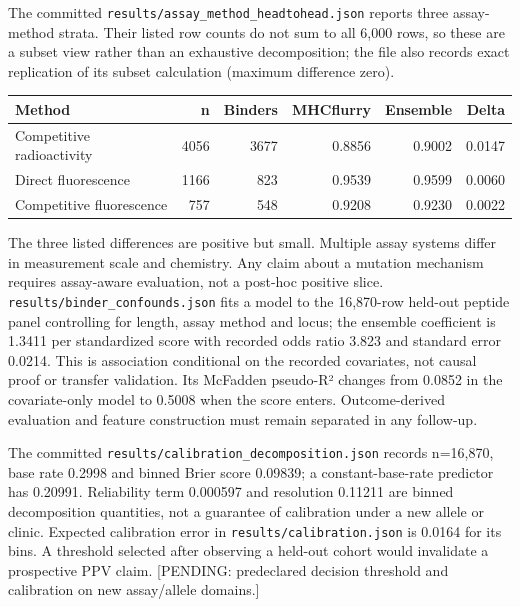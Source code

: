 
The committed \texttt{results/assay\_method\_headtohead.json} reports three assay-method strata. Their listed row counts do not sum to all 6,000 rows, so these are a subset view rather than an exhaustive decomposition; the file also records exact replication of its subset calculation (maximum difference zero).

\begin{longtable}[]{@{}lrrrrr@{}}
\toprule
Method & n & Binders & MHCflurry & Ensemble & Delta\tabularnewline
\midrule
\endhead
Competitive radioactivity & 4056 & 3677 & 0.8856 & 0.9002 & 0.0147\tabularnewline
Direct fluorescence & 1166 & 823 & 0.9539 & 0.9599 & 0.0060\tabularnewline
Competitive fluorescence & 757 & 548 & 0.9208 & 0.9230 & 0.0022\tabularnewline
\bottomrule
\end{longtable}

The three listed differences are positive but small. Multiple assay systems differ in measurement scale and chemistry. Any claim about a mutation mechanism requires assay-aware evaluation, not a post-hoc positive slice. \texttt{results/binder\_confounds.json} fits a model to the 16,870-row held-out peptide panel controlling for length, assay method and locus; the ensemble coefficient is 1.3411 per standardized score with recorded odds ratio 3.823 and standard error 0.0214. This is association conditional on the recorded covariates, not causal proof or transfer validation. Its McFadden pseudo-R² changes from 0.0852 in the covariate-only model to 0.5008 when the score enters. Outcome-derived evaluation and feature construction must remain separated in any follow-up.


The committed \texttt{results/calibration\_decomposition.json} records n=16,870, base rate 0.2998 and binned Brier score 0.09839; a constant-base-rate predictor has 0.20991. Reliability term 0.000597 and resolution 0.11211 are binned decomposition quantities, not a guarantee of calibration under a new allele or clinic. Expected calibration error in \texttt{results/calibration.json} is 0.0164 for its bins. A threshold selected after observing a held-out cohort would invalidate a prospective PPV claim. {[}PENDING: predeclared decision threshold and calibration on new assay/allele domains.{]}

